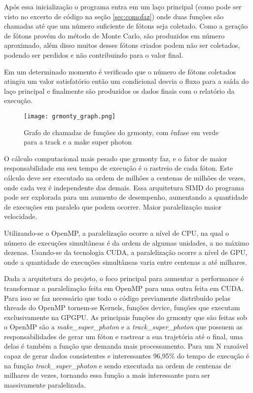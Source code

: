   Após essa inicialização o programa entra em um laço principal (como pode ser visto no excerto de código na seção \ref{sec:comofaz}) onde duas funções são chamadas até que um número suficiente de fótons seja coletado. Como a geração de fótons provém do método de Monte Carlo, são produzidos em número aproximado, além disso muitos desses fótons criados podem não ser coletados, podendo ser perdidos e não contribuindo para o valor final.

  Em um determinado momento é verificado que o número de fótons coletados atingiu um valor satisfatório então um condicional desvia o fluxo para a saída do laço principal e finalmente são produzidos os dados finais com o relatório da execução.

  \begin{figure}[!h]
    \centering
    \texttt{[image: grmonty\_graph.png]}
    \caption{Grafo de chamadas de funções do grmonty, com ênfase em verde para a track e a make super photon}
    \label{fig:grmontyGraph}
  \end{figure}

  O cálculo computacional mais pesado que grmonty faz, e o fator de maior responsabilidade em seu tempo de execução é o rastreio de cada fóton. Este cálculo deve ser executado na ordem de milhões a centenas de milhões de vezes, onde cada vez é independente das demais. Essa arquitetura SIMD do programa pode ser explorada para um aumento de desempenho, aumentando a quantidade de execuções em paralelo que podem ocorrer. Maior paralelização maior velocidade.
  
  Utilizando-se o OpenMP, a paralelização ocorre a nível de CPU, na qual o número de execuções simultâneas é da ordem de algumas unidades, a no máximo dezenas. Usando-se da tecnologia CUDA, a paralelização ocorre a nível de GPU, onde a quantidade de execuções simultâneas varia entre centenas a até milhares.

  Dada a arquitetura do projeto, o foco principal para aumentar a performance é transformar a paralelização feita em OpenMP para uma outra feita em CUDA. Para isso se faz necessário que todo o código previamente distribuído pelas threads do OpenMP tornem-se Kernels, funções device, funções que executam exclusivamente na GPGPU. As principais funções do grmonty que são feitas sob o OpenMP são a \textit{make\_super\_photon} e a \textit{track\_super\_photon} que possuem as responsabilidades de gerar um fóton e rastrear a sua trajetória até o final, uma delas é também a função que demanda mais processamento. Para um N razoável capaz de gerar dados consistentes e interessantes 96,95\% do tempo de execução é na função \textit{track\_super\_photon} e sendo executada na ordem de centenas de milhares de vezes, tornando essa função a mais interessante para ser massivamente paralelizada.

